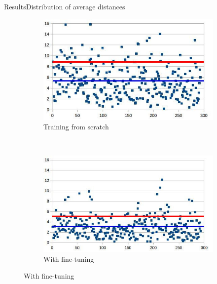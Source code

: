 \documentclass[10pt]{beamer}
\begin{document}
\begin{frame}{Results}{Distribution of average distances}
\begin{itemize}
{\begin{figure}[htbp]
\begin{subfigure}[t]{0.5\textwidth}
        			\centering
        			\includegraphics[scale=.4]{images/lm6_cnn_2}
        			\caption{Training from scratch}
    			\end{subfigure}%
    			~ 
    			\begin{subfigure}[t]{0.5\textwidth}
        			\centering
        			\includegraphics[scale=.38]{images/lm6_finetuning_2}
        			\caption{With fine-tuning}
    			\end{subfigure}    		
			\end{figure}
		}
	\end{itemize}

\end{frame}
\end{document}
